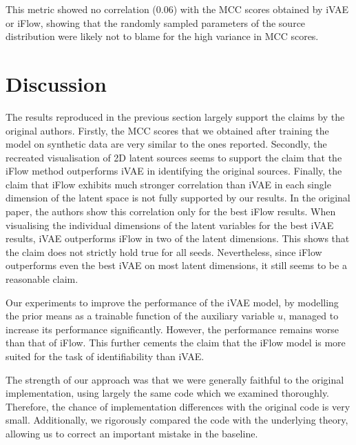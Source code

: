 This metric showed no correlation (0.06) with the MCC scores obtained by iVAE or iFlow, showing that the randomly sampled parameters of the source distribution were likely not to blame for the high variance in MCC scores. 

\section{Discussion}
The results reproduced in the previous section largely support the claims by the original authors. Firstly, the MCC scores that we obtained after training the model on synthetic data are very similar to the ones reported. Secondly, the recreated visualisation of 2D latent sources seems to support the claim that the iFlow method outperforms iVAE in identifying the original sources. Finally, the claim that iFlow exhibits much stronger correlation than iVAE in each single dimension of the latent space is not fully supported by our results. In the original paper, the authors show this correlation only for the best iFlow results. When visualising the individual dimensions of the latent variables for the best iVAE results, iVAE outperforms iFlow in two of the latent dimensions. This shows that the claim does not strictly hold true for all seeds. Nevertheless, since iFlow outperforms even the best iVAE on most latent dimensions, it still seems to be a reasonable claim.

Our experiments to improve the performance of the iVAE model, by modelling the prior means as a trainable function of the auxiliary variable $u$, managed to increase its performance significantly. However, the performance remains worse than that of iFlow. This further cements the claim that the iFlow model is more suited for the task of identifiability than iVAE.

The strength of our approach was that we were generally faithful to the original implementation, using largely the same code which we examined thoroughly. Therefore, the chance of implementation differences with the original code is very small. Additionally, we rigorously compared the code with the underlying theory, allowing us to correct an important mistake in the baseline.

